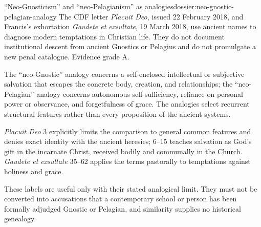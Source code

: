 \begin{heresydossier}{``Neo-Gnosticism'' and ``neo-Pelagianism'' as analogies}{dossier:neo-gnostic-pelagian-analogy}
\objectfield The CDF letter \emph{Placuit Deo}, issued 22 February 2018, and Francis's exhortation \emph{Gaudete et exsultate}, 19 March 2018, use ancient names to diagnose modern temptations in Christian life. They do not document institutional descent from ancient Gnostics or Pelagius and do not promulgate a new penal catalogue. Evidence grade A.

\propositionfield The ``neo-Gnostic'' analogy concerns a self-enclosed intellectual or subjective salvation that escapes the concrete body, creation, and relationships; the ``neo-Pelagian'' analogy concerns autonomous self-sufficiency, reliance on personal power or observance, and forgetfulness of grace. The analogies select recurrent structural features rather than every proposition of the ancient systems.

\responsefield \emph{Placuit Deo} 3 explicitly limits the comparison to general common features and denies exact identity with the ancient heresies; 6--15 teaches salvation as God's gift in the incarnate Christ, received bodily and communally in the Church. \emph{Gaudete et exsultate} 35--62 applies the terms pastorally to temptations against holiness and grace.

\aftermathfield These labels are useful only with their stated analogical limit. They must not be converted into accusations that a contemporary school or person has been formally adjudged Gnostic or Pelagian, and similarity supplies no historical genealogy.
\end{heresydossier}
